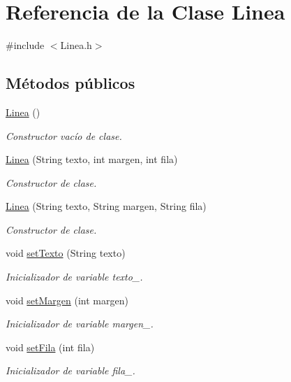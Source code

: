 \hypertarget{classLinea}{}\section{Referencia de la Clase Linea}
\label{classLinea}


{\ttfamily \#include $<$Linea.\+h$>$}

\subsection*{Métodos públicos}
\begin{DoxyCompactItemize}
\item 
\hyperlink{classLinea_a5f42335b458068e8c0988671bcec9174}{Linea} ()
\begin{DoxyCompactList}\small\item\em Constructor vacío de clase. \end{DoxyCompactList}\item 
\hyperlink{classLinea_a215a10b964d2e675e3cb5ec5a860bde5}{Linea} (String texto, int margen, int fila)
\begin{DoxyCompactList}\small\item\em Constructor de clase. \end{DoxyCompactList}\item 
\hyperlink{classLinea_a2c8903dd8209efccf84b460d3505f349}{Linea} (String texto, String margen, String fila)
\begin{DoxyCompactList}\small\item\em Constructor de clase. \end{DoxyCompactList}\item 
void \hyperlink{classLinea_a3b60a658d35a2382c6b3e8b8f60c9427}{set\+Texto} (String texto)
\begin{DoxyCompactList}\small\item\em Inicializador de variable texto\+\_\+. \end{DoxyCompactList}\item 
void \hyperlink{classLinea_a57fff697912f1c5a8915ee5e502507c7}{set\+Margen} (int margen)
\begin{DoxyCompactList}\small\item\em Inicializador de variable margen\+\_\+. \end{DoxyCompactList}\item 
void \hyperlink{classLinea_a3355a997c1cbe28e16bba9271368bf59}{set\+Fila} (int fila)
\begin{DoxyCompactList}\small\item\em Inicializador de variable fila\+\_\+. \end{DoxyCompactList}\item 

\end{DoxyCompactItemize}
